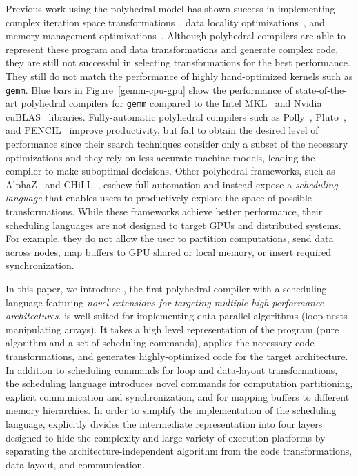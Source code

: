 Previous work using the polyhedral model has shown success in implementing complex iteration space transformations~\cite{wolf1991loop,bondhugula_practical_2008,trifunovic_graphite_2010,polly,Vasilache2018TensorCF}, data locality optimizations~\cite{Iri88,tobias_hexagonal_cgo13}, and memory management optimizations~\cite{feautrier_array_1988,thies_unified_2001,lefebvre_automatic_1998,Qui00,Darte_contraction_2005}.
Although polyhedral compilers are able to represent these program and data transformations and generate complex code, they are still not successful in selecting transformations for the best performance. They still do not match the performance of highly hand-optimized kernels such as \texttt{gemm}. Blue bars in Figure~\ref{gemm-cpu-gpu} show the performance of state-of-the-art polyhedral compilers for \texttt{gemm} compared to the Intel MKL~\cite{mkl} and Nvidia cuBLAS~\cite{cublas} libraries.
Fully-automatic polyhedral compilers such as Polly~\cite{polly}, Pluto~\cite{bondhugula_practical_2008}, and PENCIL~\cite{pencil_paper,pencil_pact} improve productivity, but fail to obtain the desired level of performance since their search techniques consider only a subset of the necessary optimizations and they rely on less accurate machine models, leading the compiler to make suboptimal decisions.
Other polyhedral frameworks, such as AlphaZ~\cite{yuki2012alphaz} and CHiLL~\cite{chill}, eschew full automation and instead expose a \textit{scheduling language} that enables users to productively explore the space of possible transformations.
While these frameworks achieve better performance, their scheduling languages are not designed to target GPUs and distributed systems. For example, they do not allow the user to partition computations, send data across nodes, map buffers to GPU shared or local memory,  or insert required synchronization.

In this paper, we introduce \framework{}, the first polyhedral compiler with a scheduling language featuring \emph{novel extensions for targeting multiple high performance architectures}.
\framework{} is well suited for implementing data parallel algorithms (loop nests manipulating arrays).
It takes a high level representation of the program (pure algorithm and a set of scheduling commands), applies the necessary code transformations, and generates highly-optimized code for the target architecture.   
In addition to scheduling commands for loop and data-layout transformations, the \framework{} scheduling language introduces novel commands for computation partitioning, explicit communication and synchronization, and for mapping buffers to different memory hierarchies.
In order to simplify the implementation of the scheduling language, \framework{} explicitly divides the intermediate representation into four layers designed to hide the complexity and large variety of execution platforms by separating the architecture-independent algorithm from the code transformations, data-layout, and communication.

